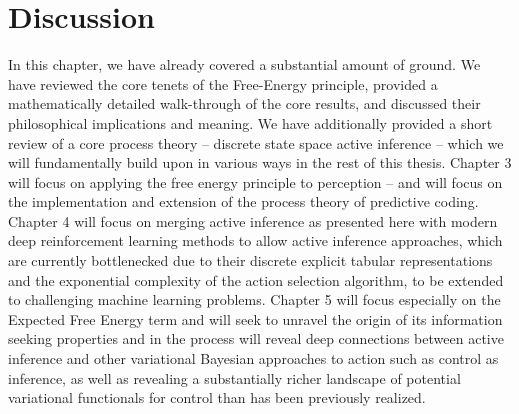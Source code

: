 \section{Discussion}

In this chapter, we have already covered a substantial amount of ground. We have reviewed the core tenets of the Free-Energy principle, provided a mathematically detailed walk-through of the core results, and discussed their philosophical implications and meaning. We have additionally provided a short review of a core process theory -- discrete state space active inference -- which we will fundamentally build upon in various ways in the rest of this thesis. Chapter 3 will focus on applying the free energy principle to perception -- and will focus on the implementation and extension of the process theory of predictive coding. Chapter 4 will focus on merging active inference as presented here with modern deep reinforcement learning methods to allow active inference approaches, which are currently bottlenecked due to their discrete explicit tabular representations and the exponential complexity of the action selection algorithm, to be extended to challenging machine learning problems. Chapter 5 will focus especially on the Expected Free Energy term and will seek to unravel the origin of its information seeking properties and in the process will reveal deep connections between active inference and other variational Bayesian approaches to action such as control as inference, as well as revealing a substantially richer landscape of potential variational functionals for control than has been previously realized.